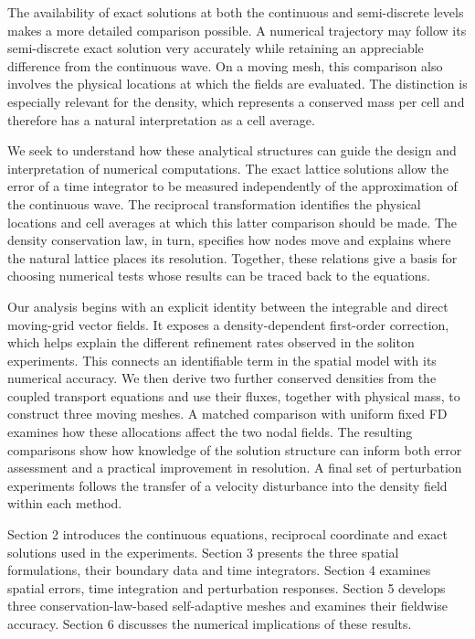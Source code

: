 \documentclass[11pt,a4paper]{article}
\begin{document}
The availability of exact solutions at both the continuous and semi-discrete levels makes a more detailed comparison possible. A numerical trajectory may follow its semi-discrete exact solution very accurately while retaining an appreciable difference from the continuous wave. On a moving mesh, this comparison also involves the physical locations at which the fields are evaluated. The distinction is especially relevant for the density, which represents a conserved mass per cell and therefore has a natural interpretation as a cell average.

We seek to understand how these analytical structures can guide the design and interpretation of numerical computations. The exact lattice solutions allow the error of a time integrator to be measured independently of the approximation of the continuous wave. The reciprocal transformation identifies the physical locations and cell averages at which this latter comparison should be made. The density conservation law, in turn, specifies how nodes move and explains where the natural lattice places its resolution. Together, these relations give a basis for choosing numerical tests whose results can be traced back to the equations.

Our analysis begins with an explicit identity between the integrable and direct moving-grid vector fields. It exposes a density-dependent first-order correction, which helps explain the different refinement rates observed in the soliton experiments. This connects an identifiable term in the spatial model with its numerical accuracy. We then derive two further conserved densities from the coupled transport equations and use their fluxes, together with physical mass, to construct three moving meshes. A matched comparison with uniform fixed FD examines how these allocations affect the two nodal fields. The resulting comparisons show how knowledge of the solution structure can inform both error assessment and a practical improvement in resolution. A final set of perturbation experiments follows the transfer of a velocity disturbance into the density field within each method.

Section 2 introduces the continuous equations, reciprocal coordinate and exact solutions used in the experiments. Section 3 presents the three spatial formulations, their boundary data and time integrators. Section 4 examines spatial errors, time integration and perturbation responses. Section 5 develops three conservation-law-based self-adaptive meshes and examines their fieldwise accuracy. Section 6 discusses the numerical implications of these results.
\end{document}

